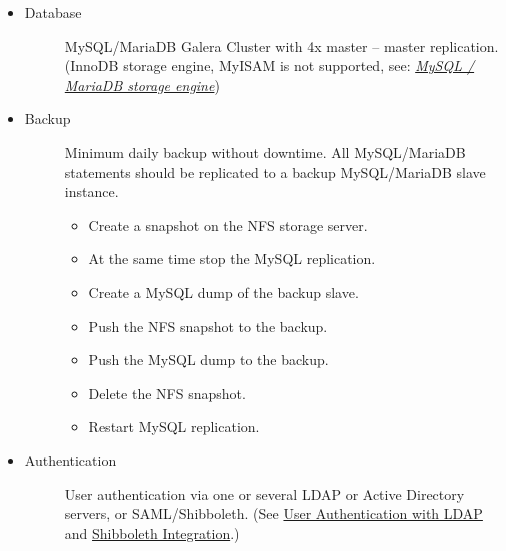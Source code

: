 \documentclass[letterpaper,10pt,english]{sphinxmanual}
\begin{document}
\begin{itemize}
\item {} \begin{description}
\item[{Database}] \leavevmode
MySQL/MariaDB Galera Cluster with 4x master -- master replication. (InnoDB storage engine, MyISAM is not supported, see: {\hyperref[configuration_database/linux_database_configuration:db\string-storage\string-engine\string-label]{\emph{MySQL / MariaDB storage engine}}})

\end{description}

\item {} \begin{description}
\item[{Backup}] \leavevmode
Minimum daily backup without downtime. All MySQL/MariaDB statements should
be replicated to a backup MySQL/MariaDB slave instance.
\begin{itemize}
\item {} 
Create a snapshot on the NFS storage server.

\item {} 
At the same time stop the MySQL replication.

\item {} 
Create a MySQL dump of the backup slave.

\item {} 
Push the NFS snapshot to the backup.

\item {} 
Push the MySQL dump to the backup.

\item {} 
Delete the NFS snapshot.

\item {} 
Restart MySQL replication.

\end{itemize}

\end{description}

\item {} \begin{description}
\item[{Authentication}] \leavevmode
User authentication via one or several LDAP or Active Directory
servers, or SAML/Shibboleth. (See \href{https://doc.owncloud.org/server/9.0/admin\_manual/configuration\_user/user\_auth\_ldap.html}{User Authentication with LDAP} and
\href{https://doc.owncloud.org/server/9.0/admin\_manual/enterprise\_user\_management/user\_auth\_shibboleth.html}{Shibboleth Integration}.)


\end{description}
\end{itemize}
\end{document}
